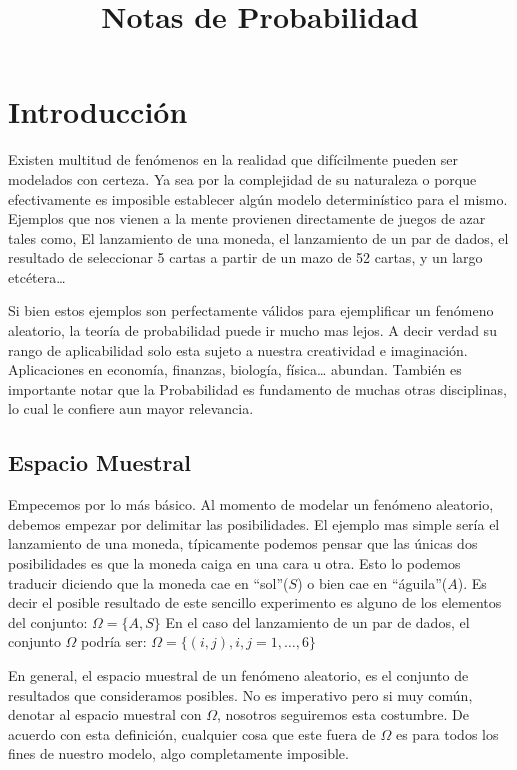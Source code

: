 \documentclass[14pt]{extreport}
\title{Notas de Probabilidad}
\newcounter{ejemplo}[chapter]
\begin{document}
\chapter{Introducción}


Existen multitud de fenómenos en la realidad que difícilmente pueden ser modelados con certeza. Ya sea por la complejidad de su naturaleza o
porque efectivamente es imposible establecer algún modelo determinístico para el mismo. Ejemplos que nos vienen a la mente provienen directamente
de juegos de azar tales como, El lanzamiento de una moneda, el lanzamiento de un par de dados, el resultado de seleccionar 5 cartas a partir de un mazo de 52 cartas, y un largo etcétera\ldots{}

Si bien estos ejemplos son perfectamente válidos para ejemplificar un fenómeno aleatorio, la teoría de probabilidad puede ir mucho mas lejos. A decir verdad su rango de aplicabilidad solo esta sujeto a nuestra creatividad e imaginación. Aplicaciones en economía, finanzas, biología, física\dots{} abundan. También es importante notar que la Probabilidad es fundamento de muchas otras disciplinas, lo cual le confiere aun mayor relevancia.


\section{Espacio Muestral}

Empecemos por lo más básico. Al momento de modelar un fenómeno aleatorio, debemos empezar por delimitar las posibilidades. El ejemplo mas simple sería el lanzamiento de una moneda, típicamente podemos pensar que las únicas dos posibilidades es que la moneda caiga en una cara u otra. Esto lo podemos traducir diciendo que la moneda cae en ``sol''($S$) o bien cae en ``águila''($A$). Es decir el posible resultado de este sencillo experimento es alguno de los elementos del conjunto: $\Omega = \{A, S\}$ En el caso del lanzamiento de un par de dados, el conjunto $\Omega$ podría ser: $\Omega = \{(i , j), i , j = 1,\ldots , 6\}$

En general, el espacio muestral de un fenómeno aleatorio, es el conjunto de resultados que consideramos posibles. No es imperativo pero si muy común, denotar al espacio muestral con $\Omega$, nosotros seguiremos esta costumbre. De acuerdo con esta definición, cualquier cosa que este fuera de $\Omega$ es para todos los fines de nuestro modelo, algo completamente imposible.
\end{document}
